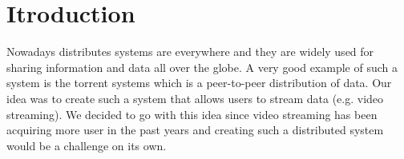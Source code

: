 \section{Itroduction}
\label{intro}

Nowadays distributes systems are everywhere and they are widely used for sharing information and data all over the globe. A very good example of such a system is the torrent systems which is a peer-to-peer distribution of data. Our idea was to create such a system that allows users to stream data (e.g. video streaming). We decided to go with this idea since video streaming has been acquiring more user in the past years and creating such a distributed system would be a challenge on its own.\\